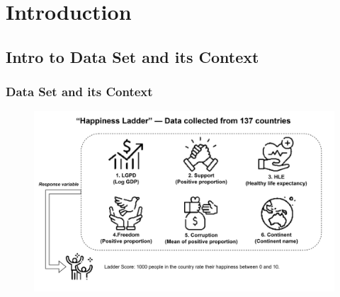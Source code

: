 \documentclass{beamer}
\begin{document}
% 
\begin{frame}
  \titlepage
\end{frame}
% 
% 
\begin{frame}
  \tableofcontents
\end{frame}
% 
% 
% 
% 
% 
% 
\section{Introduction}
\subsection{Intro to Data Set and its Context}
% 
% 
% 
% 
\begin{frame}
  \frametitle{Data Set and its Context}
  \begin{figure}
    \includegraphics[width=\textwidth]{img/Intro to Dataset.png}
  \end{figure}
\end{frame}
% 
% 
% 
% 
% 
% 
% 
% 
% 
% 
% 
% 
\end{document}
